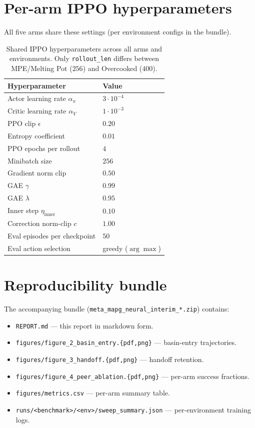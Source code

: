 \documentclass[11pt,a4paper]{article}
\begin{document}
\appendix

\section{Per-arm IPPO hyperparameters}\label{app:hp}

All five arms share these settings (per environment configs in the bundle).

\begin{table}[h]
\centering
\caption{Shared IPPO hyperparameters across all arms and environments. Only \texttt{rollout\_len} differs between MPE/Melting Pot ($256$) and Overcooked ($400$).}
\label{tab:hp}
\begin{tabular}{ll}
\toprule
\textbf{Hyperparameter} & \textbf{Value} \\
\midrule
Actor learning rate $\alpha_\pi$ & $3 \cdot 10^{-4}$ \\
Critic learning rate $\alpha_V$  & $1 \cdot 10^{-3}$ \\
PPO clip $\epsilon$              & $0.20$ \\
Entropy coefficient              & $0.01$ \\
PPO epochs per rollout           & $4$ \\
Minibatch size                   & $256$ \\
Gradient norm clip               & $0.50$ \\
GAE $\gamma$                     & $0.99$ \\
GAE $\lambda$                    & $0.95$ \\
Inner step $\eta_{\text{inner}}$ & $0.10$ \\
Correction norm-clip $c$         & $1.00$ \\
Eval episodes per checkpoint     & $50$ \\
Eval action selection            & greedy ($\arg\max$) \\
\bottomrule
\end{tabular}
\end{table}

\section{Reproducibility bundle}

The accompanying bundle (\texttt{meta\_mapg\_neural\_interim\_*.zip}) contains:

\begin{itemize}[leftmargin=2em]
    \item \texttt{REPORT.md} --- this report in markdown form.
    \item \texttt{figures/figure\_2\_basin\_entry.\{pdf,png\}} --- basin-entry trajectories.
    \item \texttt{figures/figure\_3\_handoff.\{pdf,png\}} --- handoff retention.
    \item \texttt{figures/figure\_4\_peer\_ablation.\{pdf,png\}} --- per-arm success fractions.
    \item \texttt{figures/metrics.csv} --- per-arm summary table.
    \item \texttt{runs/<benchmark>/<env>/sweep\_summary.json} --- per-environment training logs.
\end{itemize}
\end{document}
